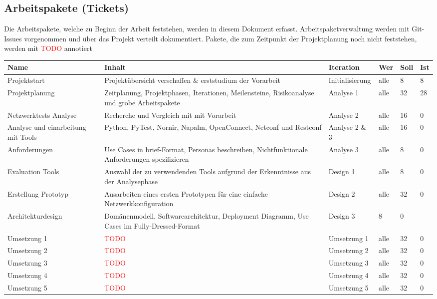 \documentclass[
	ngerman,
	toc=listof, %
	toc=bibliography, %
	footnotes=multiple, %
	parskip=half, %
	numbers=noendperiod %
]{scrartcl}
\begin{document}
	\subsection{Arbeitspakete (Tickets) }
	Die Arbeitspakete, welche zu Beginn der Arbeit feststehen, werden in diesem Dokument erfasst.
	Arbeitspaketverwaltung werden mit Git-Issues vorgenommen und über das Projekt verteilt dokumentiert.
	Pakete, die zum Zeitpunkt der Projektplanung noch nicht feststehen, werden mit \textcolor{red}{TODO} annotiert	
	\begin{landscape}
			\begin{table}[!h]
				\begin{tabularx}{\linewidth}{lXllll}
					\toprule
					Name & Inhalt & Iteration & Wer & Soll & Ist\\
					\midrule
					Projektstart & Projektübersicht verschaffen \& erststudium der Vorarbeit & Initialisierung & alle & 8 & 8 \\
					\midrule
					Projektplanung & Zeitplanung, Projektphasen, Iterationen, Meilensteine, Risikoanalyse und grobe Arbeitspakete & Analyse 1 & alle & 32 & 28 \\
					Netzwerktests Analyse & Recherche und Vergleich mit mit Vorarbeit & Analyse 2 & alle & 16 & 0 \\
					Analyse und einarbeitung mit Tools & Python, PyTest, Nornir, Napalm, OpenConnect, Netconf und Restconf & Analyse 2 \& 3 & alle & 16 & 0 \\
					Anforderungen & Use Cases in brief-Format, Personas beschreiben, Nichtfunktionale Anforderungen spezifizieren & Analyse 3 & alle & 8 & 0 \\
					\midrule
					Evaluation Tools & Auswahl der zu verwendenden Tools aufgrund der Erkenntnisse aus der Analysephase & Design 1 & alle & 8 & 0 \\
					Erstellung Prototyp & Ausarbeiten eines ersten Prototypen für eine einfache Netzwerkkonfiguration & Design 2 & alle & 32 & 0 \\
					Architekturdesign & Domänenmodell, Softwarearchitektur, Deployment Diagramm, Use Cases im Fully-Dressed-Format & Design 3 & 8 & 0 \\
					\midrule
					Umsetzung 1 & \textcolor{red}{TODO} & Umsetzung 1 & alle & 32 & 0 \\
					Umsetzung 2 & \textcolor{red}{TODO} & Umsetzung 2 & alle & 32 & 0 \\
					Umsetzung 3 & \textcolor{red}{TODO} & Umsetzung 3 & alle & 32 & 0 \\
					Umsetzung 4 & \textcolor{red}{TODO} & Umsetzung 4 & alle & 32 & 0 \\
					Umsetzung 5 & \textcolor{red}{TODO} & Umsetzung 5 & alle & 32 & 0 \\
	

\end{tabularx}
\end{table}
\end{landscape}
\end{document}
